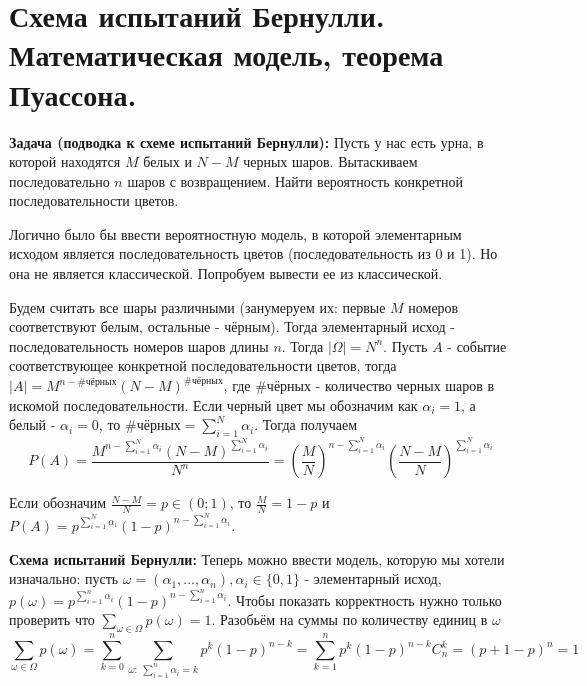\section{Схема испытаний Бернулли. Математическая модель, теорема Пуассона.}
\par \textbf{Задача (подводка к схеме испытаний Бернулли):} Пусть у нас есть урна, в которой находятся $M$ белых и $N-M$ черных шаров. Вытаскиваем последовательно $n$ шаров с возвращением. Найти вероятность конкретной последовательности цветов.
\par \Solution Логично было бы ввести вероятностную модель, в которой элементарным исходом является последовательность цветов (последовательность из 0 и 1). Но она не является классической. Попробуем вывести ее из классической.
\par Будем считать все шары различными (занумеруем их: первые $M$ номеров соответствуют белым, остальные - чёрным). Тогда элементарный исход - последовательность номеров шаров длины $n$. Тогда $|\Omega|=N^n$. Пусть $A$ - событие соответствующее конкретной последовательности цветов, тогда $|A|=M^{n-\text{\#чёрных}}(N-M)^{\text{\#чёрных}}$, где \#чёрных - количество черных шаров в искомой последовательности. Если черный цвет мы обозначим как $\alpha_i=1$, а белый - $\alpha_i=0$, то \#чёрных$=\sum_{i=1}^N \alpha_i$. Тогда получаем $$P(A)=\frac{M^{n-\sum_{i=1}^N \alpha_i}(N-M)^{\sum_{i=1}^N \alpha_i}}{N^n}=\left(\frac{M}{N}\right)^{n-\sum_{i=1}^N \alpha_i}\left(\frac{N-M}{N}\right)^{\sum_{i=1}^N \alpha_i}$$
\par Если обозначим $\frac{N-M}{N}=p \in (0;1)$, то $\frac{M}{N}=1-p$ и $P(A)=p^{\sum_{i=1}^N \alpha_i}(1-p)^{n-\sum_{i=1}^N \alpha_i}$.
\par \textbf{Схема испытаний Бернулли:} Теперь можно ввести модель, которую мы хотели изначально: пусть $\omega=(\alpha_1, \ldots, \alpha_n), \alpha_i \in \{0,1\}$ - элементарный исход, $p(\omega)=p^{\sum_{i=1}^n \alpha_i}(1-p)^{n-\sum_{i=1}^n \alpha_i}$. Чтобы показать корректность нужно только проверить что $\sum_{\omega \in \Omega}p(\omega)=1$. Разобьём на суммы по количеству единиц в $\omega$
$$\sum_{\omega \in \Omega} p(\omega)=\sum_{k=0}^n \sum_{\omega: \: \sum_{i=1}^n\alpha_i=k} p^k (1-p)^{n-k}=\sum_{k=1}^n p^k(1-p)^{n-k} C_n^k=(p+1-p)^n=1$$

